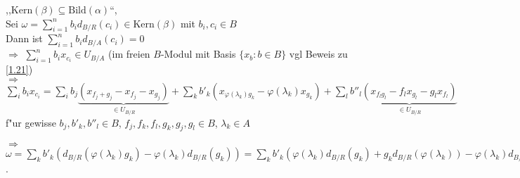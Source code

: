 \begin{Prop}
\begin{enumerate}
\begin{Bew}
,,$\mbox{Kern}(\beta) \subseteq \mbox{Bild}(\alpha)$``,\\
Sei $\omega = \sum_{i=1}^n{b_i} d_{B/R}(c_i) \in \mbox{Kern}(\beta)$ mit $b_i,c_i \in B$\\
Dann ist $\sum_{i=1}^n{b_i d_{B/A}}(c_i) = 0$\\
$\Rightarrow$ $\sum_{i=1}^n{b_i x_{c_i}} \in U_{B/A}$ (im freien $B$-Modul mit Basis $\{ x_b : b \in B \}$ vgl Beweis zu \ref{1.21})\\
$\Rightarrow$ $\sum_i b_i x_{c_i} = \sum_i b_j \underbrace{(x_{f_j + g_j} - x_{f_j} - x_{g_j})}_{\in U_{B/R}} + \sum_k b'_k (x_{\varphi(\lambda_k) g_k} - \varphi(\lambda_k) x_{g_k}) + \sum_l b''_l \underbrace{(x_{f_l g_l} - f_l x_{g_l} - g_l x_{f_l})}_{\in U_{B/R}}$ f"ur gewisse $b_j, b'_k, b''_l \in B$, $f_j,f_k,f_l,g_k,g_j,g_l \in B$, $\lambda_k \in A$

$\Rightarrow$ $\omega = \sum_k b'_k (d_{B/R}(\varphi(\lambda_k) g_k) - \varphi(\lambda_k) d_{B/R}(g_k)) = \sum_k b'_k (\varphi(\lambda_k) d_{B/R}(g_k) + g_k d_{B/R}(\varphi(\lambda_k)) - \varphi(\lambda_k) d_{B/R}(g_k)) = \sum_k b'_k g_k d_{B/R}(\varphi(\lambda_k)) = \alpha(\sum_k d\lambda_k \otimes b'_k g_k)$.
\end{Bew}
\end{enumerate}
\end{Prop}
